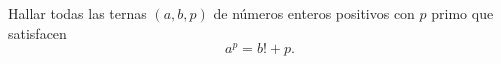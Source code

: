 Hallar todas las ternas $(a,b,p)$ de números enteros positivos con $p$ primo que satisfacen
\[a^p=b!+p.\]